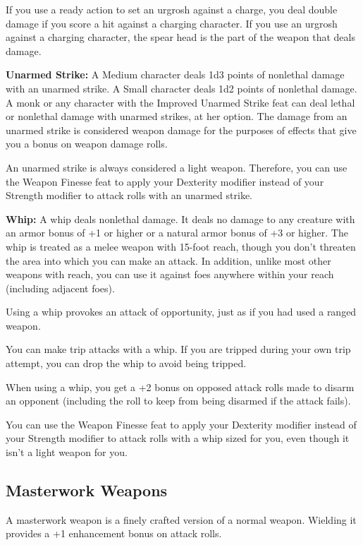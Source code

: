 \begin{multicols}{2}
If you use a ready action to set an urgrosh against a charge, you deal double damage if you score a hit against a charging character. If you use an urgrosh against a charging character, the spear head is the part of the weapon that deals damage.

\textbf{Unarmed Strike:} A Medium character deals 1d3 points of nonlethal damage with an unarmed strike. A Small character deals 1d2 points of nonlethal damage. A monk or any character with the Improved Unarmed Strike feat can deal lethal or nonlethal damage with unarmed strikes, at her option. The damage from an unarmed strike is considered weapon damage for the purposes of effects that give you a bonus on weapon damage rolls.

An unarmed strike is always considered a light weapon. Therefore, you can use the Weapon Finesse feat to apply your Dexterity modifier instead of your Strength modifier to attack rolls with an unarmed strike.

\textbf{Whip:} A whip deals nonlethal damage. It deals no damage to any creature with an armor bonus of +1 or higher or a natural armor bonus of +3 or higher. The whip is treated as a melee weapon with 15-foot reach, though you don't threaten the area into which you can make an attack. In addition, unlike most other weapons with reach, you can use it against foes anywhere within your reach (including adjacent foes).

Using a whip provokes an attack of opportunity, just as if you had used a ranged weapon.

You can make trip attacks with a whip. If you are tripped during your own trip attempt, you can drop the whip to avoid being tripped.

When using a whip, you get a +2 bonus on opposed attack rolls made to disarm an opponent (including the roll to keep from being disarmed if the attack fails).

You can use the Weapon Finesse feat to apply your Dexterity modifier instead of your Strength modifier to attack rolls with a whip sized for you, even though it isn't a light weapon for you.

\subsection{Masterwork Weapons}

A masterwork weapon is a finely crafted version of a normal weapon. Wielding it provides a +1 enhancement bonus on attack rolls.


\end{multicols}
